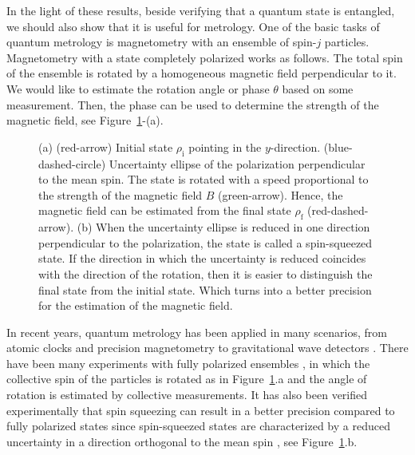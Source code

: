 In the light of these results, beside verifying that a quantum state is entangled, we should also show that it is useful for metrology.
One of the basic tasks of quantum metrology is magnetometry with an ensemble of spin-$j$ particles.
Magnetometry with a state completely polarized works as follows.
The total spin of the ensemble is rotated by a homogeneous magnetic field perpendicular to it.
We would like to estimate the rotation angle or phase $\theta$ based on some measurement.
Then, the phase can be used to determine the strength of the magnetic field,
see Figure~\ref{fig:int-magnetometry-totally-polarized}-(a).
\begin{figure}[htp]
  \centering
  \caption[How spin-squeezed states improve the precision]{
  (a) (red-arrow) Initial state $\rho_{\text{i}}$ pointing in the $y$-direction.
  (blue-dashed-circle) Uncertainty ellipse of the polarization perpendicular to the mean spin.
  The state is rotated with a speed proportional to the strength of the magnetic field $B$ (green-arrow).
  Hence, the magnetic field can be estimated from the final state $\rho_{\text{f}}$ (red-dashed-arrow).
  (b) When the uncertainty ellipse is reduced in one direction perpendicular to the polarization, the state is called a spin-squeezed state.
  If the direction in which the uncertainty is reduced coincides with the direction of the rotation, then it is easier to distinguish the final state from the initial state.
  Which turns into a better precision for the estimation of the magnetic field.}
  \label{fig:int-magnetometry-totally-polarized}
\end{figure}

In recent years, quantum metrology has been applied in many scenarios, from atomic clocks \cite{Louchet-Chauvet2010, Borregaard2013, Kessler2014a} and precision magnetometry \cite{Wasilewski2010, Eckert2006, Wildermuth2006, Wolfgramm2010, Koschorreck2011, Vengalattore2007, Zhou2010} to gravitational wave detectors \cite{Schnabel2010, TheLIGOScientificCollaboration2011, Demkowicz-Dobrzanski2013}.
There have been many experiments with fully polarized ensembles \cite{Gross2012, Wasilewski2010, Wildermuth2006, Vengalattore2007, Behbood2013, Koschorreck2011, Muessel2014}, in which the collective spin of the particles is rotated as in Figure~\ref{fig:int-magnetometry-totally-polarized}.a and the angle of rotation is estimated by collective measurements.
It has also been verified experimentally that spin squeezing can result in a better precision compared to fully polarized states \cite{Riedel2010, Gross2012, Wasilewski2010, Muessel2014, Fernholz2008, Hald1999, Julsgaard2001, Hammerer2010, Esteve2008} since spin-squeezed states are characterized by a reduced uncertainty in a direction orthogonal to the mean spin \cite{Kitagawa1993, Wineland1994, Sorensen2001, Ma2011}, see Figure~\ref{fig:int-magnetometry-totally-polarized}.b.

